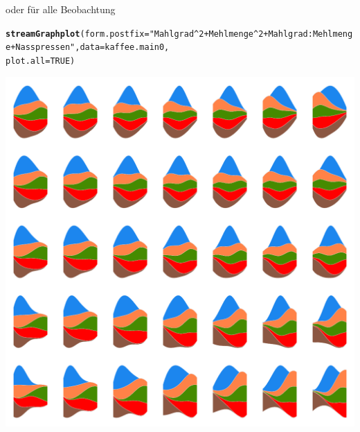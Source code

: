\documentclass[a4paper]{report}\usepackage{graphicx, color}
\makeatletter
\def\maxwidth{ %
  \ifdim\Gin@nat@width>\linewidth
    \linewidth
  \else
    \Gin@nat@width
  \fi
}
\newcommand{\hlfunctioncall}[1]{\textcolor[rgb]{0.501960784313725,0,0.329411764705882}{\textbf{#1}}}%
\newcommand{\hlstring}[1]{\textcolor[rgb]{0.6,0.6,1}{#1}}%
\newenvironment{kframe}{%
 \def\at@end@of@kframe{}%
 \ifinner\ifhmode%
  \def\at@end@of@kframe{\end{minipage}}%
  \begin{minipage}{\columnwidth}%
 \fi\fi%
 \def\FrameCommand##1{\hskip\@totalleftmargin \hskip-\fboxsep
 \colorbox{shadecolor}{##1}\hskip-\fboxsep
     \hskip-\linewidth \hskip-\@totalleftmargin \hskip\columnwidth}%
 \MakeFramed {\advance\hsize-\width
   \@totalleftmargin\z@ \linewidth\hsize
   \@setminipage}}%
 {\par\unskip\endMakeFramed%
 \at@end@of@kframe}
\newenvironment{knitrout}{}{} %
\makeatother
\begin{document}
\newpage
oder f\"ur alle Beobachtung
\begin{knitrout}
\color{fgcolor}\begin{kframe}
\begin{alltt}
\hlfunctioncall{streamGraphplot}(form.postfix = \hlstring{"Mahlgrad^2+Mehlmenge^2+Mahlgrad:Mehlmenge+Nasspressen"}, data = kaffee.main0, 
    plot.all = TRUE)
\end{alltt}
\end{kframe}

{\centering \includegraphics[width=\maxwidth]{./plot_all} 

}



\end{knitrout}
\end{document}
